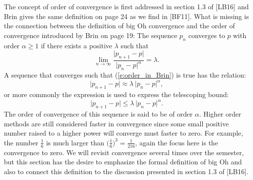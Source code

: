 \documentclass[twoside]{article}
\renewcommand{\cite}[1]{[#1]}
\def\ds{\displaystyle}
\begin{document}
The concept of order of convergence is first addressed in section 1.3 of \cite{LB16} and Brin gives the same definition on page 24 as we find in \cite{BF11}.  What is missing is the connection between the definition of big Oh convergence and the order of convergence introduced by Brin on page 19: The sequence $\ds p_n$ converges to $p$ with order $\alpha \ge 1$ if there exists a positive $\lambda$ such that
\begin{equation}
\lim_{n\rightarrow \infty} \frac {\vert p_{n+1}-p\vert}{\vert p_n-p\vert^{\alpha}}=\lambda .
\label{e:order_in_Brin}
\end{equation}
A sequence that converges such that (\ref{e:order_in_Brin}) is true has the relation:
$$  {\vert p_{n+1}-p\vert} \approx \lambda \ {\vert p_n-p\vert^{\alpha}}, $$
or more commonly the expression is used to express the telescoping bound:
$$  {\vert p_{n+1}-p\vert} \le \lambda \ {\vert p_n-p\vert^{\alpha}}.$$
The order of convergence of this sequence is said to be of order $\alpha$. Higher order methods are still considered faster in convergence since some small positive number raised to a higher power will converge must faster to zero. For example, the number $\ds \frac 16$ is much larger than $\ds \biggr (\frac 16\biggr )^3=\frac 1{216}$, again the focus here is the convergence to zero. We will revisit convergence several times over the semester, but this section has the desire to emphasize the formal definition of big Oh and also to connect this definition to the discussion presented in section 1.3 of \cite{LB16}.  
\medskip \par
\end{document}
